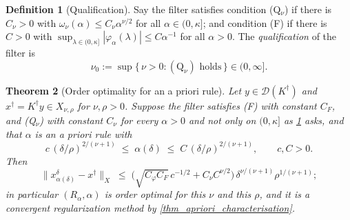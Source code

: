 \documentclass[a4paper]{report}
\theoremstyle{plain}
\newtheorem{theorem}{Theorem}[chapter]
\theoremstyle{definition}
\newtheorem{definition}[theorem]{Definition}
\theoremstyle{remark}
\newcommand{\Dom}{\mathcal{D}}
\newcommand{\dg}{^{\dagger}}
\begin{document}
\begin{definition}[Qualification]
  \label{def_qualification}
  Say the filter satisfies condition (Q$_{\nu}$) if there is $C_{\nu} > 0$ with
  $\omega_{\nu}(\alpha) \le C_{\nu}\alpha^{\nu/2}$ for all $\alpha \in (0,\kappa]$; and condition (F)
  if there is $C > 0$ with $\sup_{\lambda \in (0,\kappa]}|\varphi_{\alpha}(\lambda)| \le
  C\alpha^{-1}$ for all $\alpha > 0$.  The \emph{qualification} of the filter is
  \[
    \nu_0 := \sup\{\, \nu > 0 : (\text{Q}_{\nu}) \text{ holds} \,\} \in (0,\infty] .
  \]
\end{definition}


\begin{theorem}[Order optimality for an a priori rule]
  \label{thm_apriori_order_optimal}
  Let $y \in \Dom(K\dg)$ and $x\dg = K\dg y \in X_{\nu,\rho}$ for $\nu,\rho > 0$.  Suppose
  the filter satisfies (F) with constant $C_F$, and (Q$_{\nu}$) with constant $C_{\nu}$
  \emph{for every $\alpha > 0$} and not only on $(0,\kappa]$ as
  \cref{def_qualification} asks, and that $\alpha$ is an a priori rule with
  \[
    c\,(\delta/\rho)^{2/(\nu+1)} \;\le\; \alpha(\delta) \;\le\;
      C\,(\delta/\rho)^{2/(\nu+1)}, \qquad c, C > 0 .
  \]
  Then
  \[
    \|x^{\delta}_{\alpha(\delta)} - x\dg\|_X \;\le\;
      \bigl(\sqrt{C_{\varphi}C_F}\,c^{-1/2} + C_{\nu}C^{\nu/2}\bigr)\,
      \delta^{\nu/(\nu+1)}\rho^{1/(\nu+1)} ;
  \]
  in particular $(R_{\alpha},\alpha)$ is order optimal for this $\nu$ and this $\rho$, and
  it is a convergent regularization method by \cref{thm_apriori_characterisation}.
\end{theorem}
\end{document}
